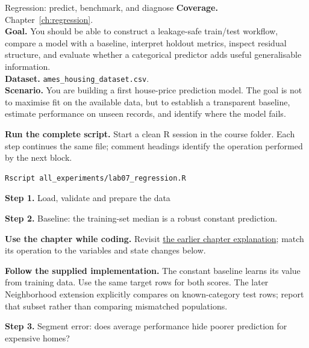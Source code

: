 
\begin{labproject}{Regression: predict, benchmark, and diagnose}
\textbf{Coverage.} Chapter~\ref{ch:regression}.\\
\textbf{Goal.} You should be able to construct a leakage-safe train/test workflow, compare a model with a baseline, interpret holdout metrics, inspect residual structure, and evaluate whether a categorical predictor adds useful generalisable information.\\
\textbf{Dataset.} \texttt{ames\_housing\_dataset.csv}.\\
\textbf{Scenario.} You are building a first house-price prediction model. The goal is not to maximise fit on the available data, but to establish a transparent baseline, estimate performance on unseen records, and identify where the model fails.



\textbf{Run the complete script.} Start a clean R session in the course folder. Each step continues the same file; comment headings identify the operation performed by the next block.
\begin{lstlisting}[style=utpterminal]
Rscript all_experiments/lab07_regression.R
\end{lstlisting}

\noindent\textbf{Step 1.} Load, validate and prepare the data


\noindent\textbf{Step 2.} Baseline: the training-set median is a robust constant prediction.



\textbf{Use the chapter while coding.} Revisit \hyperref[ch:regression]{the earlier chapter explanation}; match its operation to the variables and state changes below.

\textbf{Follow the supplied implementation.} The constant baseline learns its value from training data. Use the same target rows for both scores. The later Neighborhood extension explicitly compares on known-category test rows; report that subset rather than comparing mismatched populations.




\noindent\textbf{Step 3.} Segment error: does average performance hide poorer prediction for expensive homes?



\end{labproject}
